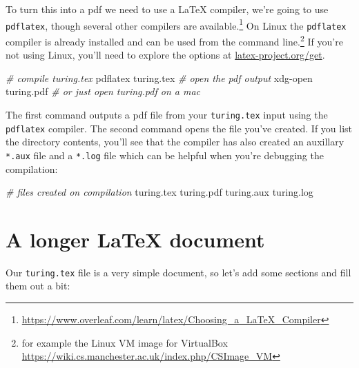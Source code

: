 \documentclass[
]{book}
\newenvironment{Shaded}{\begin{snugshade}}{\end{snugshade}}
\newcommand{\CommentTok}[1]{\textcolor[rgb]{0.56,0.35,0.01}{\textit{#1}}}
\newcommand{\NormalTok}[1]{#1}
\newcommand{\SpecialCharTok}[1]{\textcolor[rgb]{0.00,0.00,0.00}{#1}}
\begin{document}
To turn this into a pdf we need to use a LaTeX compiler, we're going to use \texttt{pdflatex}, though several other compilers are available.\footnote{\url{https://www.overleaf.com/learn/latex/Choosing_a_LaTeX_Compiler}} On Linux the \texttt{pdflatex} compiler is already installed and can be used from the command line.\footnote{for example the Linux VM image for VirtualBox \url{https://wiki.cs.manchester.ac.uk/index.php/CSImage_VM}} If you're not using Linux, you'll need to explore the options at \href{https://www.latex-project.org/get/}{latex-project.org/get}.

\begin{Shaded}
\begin{Highlighting}[]
\CommentTok{\# compile turing.tex}
\NormalTok{pdflatex turing.tex}
\CommentTok{\# open the pdf output}
\NormalTok{xdg}\SpecialCharTok{{-}}\NormalTok{open turing.pdf}
\CommentTok{\# or just open turing.pdf on a mac}
\end{Highlighting}
\end{Shaded}

The first command outputs a pdf file from your \texttt{turing.tex} input using the \texttt{pdflatex} compiler. The second command opens the file you've created. If you list the directory contents, you'll see that the compiler has also created an auxillary \texttt{*.aux} file and a \texttt{*.log} file which can be helpful when you're debugging the compilation:

\begin{Shaded}
\begin{Highlighting}[]
\CommentTok{\# files created on compilation}
\NormalTok{turing.tex}
\NormalTok{turing.pdf}
\NormalTok{turing.aux}
\NormalTok{turing.log}
\end{Highlighting}
\end{Shaded}

\hypertarget{longer}{%
\section{A longer LaTeX document}\label{longer}}

Our \texttt{turing.tex} file is a very simple document, so let's add some sections and fill them out a bit:
\end{document}
